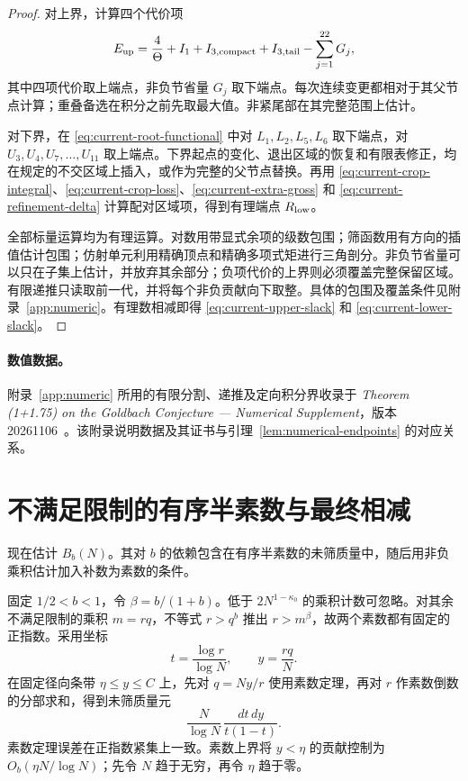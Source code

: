 \begin{proof}
对上界，计算四个代价项
\[
 E_{\rm up}=\frac4\Theta+I_1+I_{3,\mathrm{compact}}+I_{3,\mathrm{tail}}
       -\sum_{j=1}^{22}G_j,
\]
其中四项代价取上端点，非负节省量 $G_j$ 取下端点。每次连续变更都相对于其父节点计算；重叠备选在积分之前先取最大值。非紧尾部在其完整范围上估计。

对下界，在 \eqref{eq:current-root-functional} 中对 $L_1,L_2,L_5,L_6$ 取下端点，对 $U_3,U_4,U_7,\ldots,U_{11}$ 取上端点。下界起点的变化、退出区域的恢复和有限表修正，均在规定的不交区域上插入，或作为完整的父节点替换。再用 \eqref{eq:current-crop-integral}、\eqref{eq:current-crop-loss}、\eqref{eq:current-extra-gross} 和 \eqref{eq:current-refinement-delta} 计算配对区域项，得到有理端点 $R_{\rm low}$。

全部标量运算均为有理运算。对数用带显式余项的级数包围；筛函数用有方向的插值估计包围；仿射单元利用精确顶点和精确多项式矩进行三角剖分。非负节省量可以只在子集上估计，并放弃其余部分；负项代价的上界则必须覆盖完整保留区域。有限递推只读取前一代，并将每个非负贡献向下取整。具体的包围及覆盖条件见附录~\ref{app:numeric}。有理数相减即得 \eqref{eq:current-upper-slack} 和 \eqref{eq:current-lower-slack}。
\end{proof}

\paragraph{数值数据。}
附录~\ref{app:numeric} 所用的有限分割、递推及定向积分界收录于 \emph{Theorem (1+1.75) on the Goldbach Conjecture --- Numerical Supplement}，版本 20261106~\cite{ChanSupplement}。该附录说明数据及其证书与引理~\ref{lem:numerical-endpoints} 的对应关系。

\section{不满足限制的有序半素数与最终相减}
\label{sec:current-transfer}

现在估计 $B_b(N)$。其对 $b$ 的依赖包含在有序半素数的未筛质量中，随后用非负乘积估计加入补数为素数的条件。

固定 $1/2<b<1$，令 $\beta=b/(1+b)$。低于 $2N^{1-\kappa_0}$ 的乘积计数可忽略。对其余不满足限制的乘积 $m=rq$，不等式 $r>q^b$ 推出 $r>m^\beta$，故两个素数都有固定的正指数。采用坐标
\[
                       t=\frac{\log r}{\log N},\qquad y=\frac{rq}{N}.
\]
在固定径向条带 $\eta\le y\le C$ 上，先对 $q=Ny/r$ 使用素数定理，再对 $r$ 作素数倒数的分部求和，得到未筛质量元
\begin{equation}
                         \frac{N}{\log N}\,
                              \frac{dt\,dy}{t(1-t)}.
 \label{eq:current-pair-measure}
\end{equation}
素数定理误差在正指数紧集上一致。素数上界将 $y<\eta$ 的贡献控制为 $O_b(\eta N/\log N)$；先令 $N$ 趋于无穷，再令 $\eta$ 趋于零。

